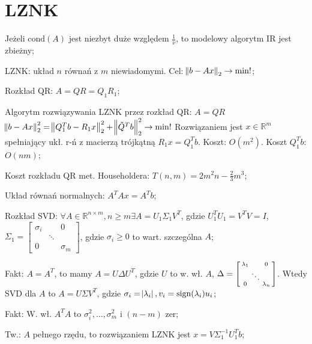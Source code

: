 \section{LZNK}


\entry
Jeżeli $\mathrm{cond}(A)$ jest niezbyt duże względem $\frac{1}{\nu}$, to modelowy algorytm IR jest zbieżny;

\entry
LZNK: układ $n$ równań z $m$ niewiadomymi.
Cel: $\norm{b - Ax}_2 \to \min !$;

\entry
Rozkład QR:
$A = QR = Q_1R_1$;

\entry
Algorytm rozwiązywania LZNK przez rozkład QR:
$A=QR$
$\norm{b-Ax}^2_2 = \norm{Q^T_1b-R_1x}^2_2 + \norm{\tilde{Q}^Tb}^2_2 \to \min !$
Rozwiązaniem jest $x\in \mathbb{R}^m$ spełniający ukł. r-ń z macierzą trójkątną $R_1x=Q_1^Tb$.
Koszt: $O(m^2)$.
Koszt $Q_1^Tb$: $O(nm)$;


\entry
Koszt rozkładu QR met. Householdera: $T(n,m)=2m^2n - \frac{2}{3}m^3$;

\entry
Układ równań normalnych:
$A^TAx=A^Tb$;



\entry
Rozkład SVD:
$\forall A \in \mathbb{R}^{n\times m}, n \geq m \exists A=U_1\Sigma_1V^T$, gdzie
$U_1^TU_1=V^TV=I$,
$\Sigma_1 =\left[\begin{smallmatrix}
    \sigma_i    &           & 0 \\
                & \ddots    &   \\
    0           &           & \sigma_m
\end{smallmatrix}\right]
$, gdzie
$\sigma_i \geq 0$ to wart. szczególna $A$;

\entry
Fakt:
$A=A^T$, to mamy $A=U\Delta U^T$, gdzie $U$ to w. wł. $A$,
$\Delta= \left[\begin{smallmatrix}
    \lambda_1   &           & 0 \\
                & \small\ddots    &   \\
    0           &           & \lambda_n
\end{smallmatrix}\right]
$.
Wtedy SVD dla $A$ to $A=U\Sigma V^T$, gdzie
$\sigma_i=\abs{\lambda_i}, v_i=\mathrm{sign}(\lambda_i)u_i$;

\entry
Fakt:
W. wł. $A^TA$ to $\sigma_i^2,\ldots,\sigma_m^2$ i $(n-m)$ zer;

\entry
Tw.:
$A$ pełnego rzędu, to rozwiązaniem LZNK jest $x=V\Sigma_1^{-1}U_1^Tb$;

